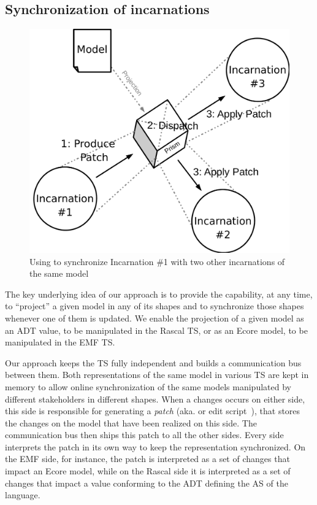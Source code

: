 \subsection{Synchronization of incarnations}

\begin{figure}[bt]
	\centering
	\includegraphics[width=.6\columnwidth]{figures/prism}
	\caption{Using \prism to synchronize Incarnation \#1 with two other incarnations of the same model}
	\label{fig:prism}
\end{figure}

The key underlying idea of our approach is to provide the capability, at any time, to ``project'' a given model in any of its shapes and to synchronize those shapes whenever one of them is updated.
We enable the projection of a given model as an ADT value, to be manipulated in the Rascal TS, or as an Ecore model, to be manipulated in the EMF TS.

Our approach keeps the TS fully independent and builds a communication bus between them.
Both representations of the same model in various TS are kept in memory to allow online synchronization of the same models manipulated by different stakeholders in different shapes.
When a changes occurs on either side, this side is responsible for generating a \emph{patch} (aka. \de or edit script~\cite{rozen2017towards}), that stores the changes on the model that have been realized on this side.
The communication bus then ships this patch to all the other sides.
Every side interprets the patch in its own way to keep the representation synchronized.
On the EMF side, for instance, the patch is interpreted as a set of changes that impact an Ecore model, while on the Rascal side it is interpreted as a set of changes that impact a value conforming to the ADT defining the AS of the language.

